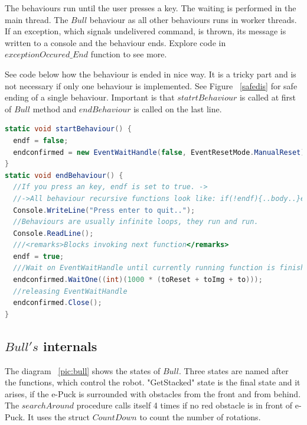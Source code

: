   The behaviours run until the user presses a key. The waiting is performed in the main thread. 
  The $Bull$ behaviour as all other behaviours runs in worker threads.
  If an exception, which signals undelivered command, is thrown, 
  its message is written to a console and the behaviour ends. 
  Explore code in $exceptionOccured\_End$ function to see more.

  See code below how the behaviour is ended in nice way. 
  It is a tricky part and is not necessary if only one behaviour is implemented. See Figure ~\ref{safedis}
  for safe ending of a single behaviour.
  Important is that $statrtBehaviour$ is called at first of $Bull$ method and $endBehaviour$ is called on the last line.
\begin{lstlisting}[language=cs]
static void startBehaviour() {
  endf = false;
  endconfirmed = new EventWaitHandle(false, EventResetMode.ManualReset);
}
static void endBehaviour() {        
  //If you press an key, endf is set to true. ->
  //->All behaviour recursive functions look like: if(!endf){..body..}else endconfirmed.Set();
  Console.WriteLine("Press enter to quit..");
  //Behaviours are usually infinite loops, they run and run.
  Console.ReadLine();
  ///<remarks>Blocks invoking next function</remarks>
  endf = true;
  ///Wait on EventWaitHandle until currently running function is finished.
  endconfirmed.WaitOne((int)(1000 * (toReset + toImg + to)));
  //releasing EventWaitHandle
  endconfirmed.Close();
}
\end{lstlisting}

\subsection{$Bull's$ internals} \label{bull}
  The diagram ~\ref{pic:bull} shows the states of $Bull$.
  Three states are named after the functions, which control the robot. "GetStacked" state
  is the final state and it arises, if the e-Puck is surrounded with obstacles from the front and from behind.
  The $searchAround$ procedure calls itself 4 times if no red obstacle is in front of e-Puck.
  It uses the struct $CountDown$ to count the number of rotations.

